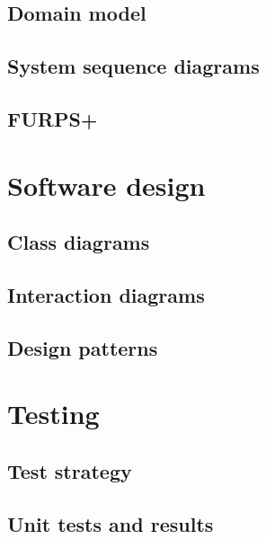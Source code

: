 \documentclass[a4paper,11pt]{article}
\begin{document}
\subsection{Domain model}


\subsection{System sequence diagrams}


\subsection{FURPS+}


\pagebreak
\section{Software design}


\subsection{Class diagrams}


\subsection{Interaction diagrams}


\subsection{Design patterns}



\pagebreak

\pagebreak

\pagebreak
\section{Testing}


\subsection{Test strategy}


\subsection{Unit tests and results}


\pagebreak


\pagebreak


\pagebreak
\appendix

\end{document}
